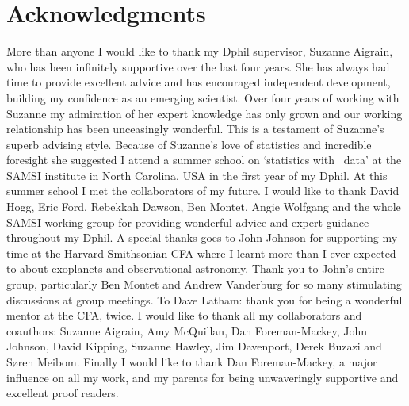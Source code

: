 % 

\cleardoublepage

\section*{Acknowledgments}

More than anyone I would like to thank my Dphil supervisor, Suzanne Aigrain,
who has been infinitely supportive over the last four years.
She has always had time to provide excellent advice and has encouraged
independent development, building my confidence as an emerging scientist.
Over four years of working with Suzanne my admiration of her expert knowledge
has only grown and our working relationship has been unceasingly wonderful.
This is a testament of Suzanne's superb advising style.
Because of Suzanne's love of statistics and incredible foresight she suggested
I attend a summer school on `statistics with \kepler\ data' at the SAMSI
institute in North Carolina, USA in the first year of my Dphil.
At this summer school I met the collaborators of my future.
I would like to thank David Hogg, Eric Ford, Rebekkah Dawson, Ben Montet,
Angie Wolfgang and the whole SAMSI working group for providing wonderful
advice and expert guidance throughout my Dphil.
A special thanks goes to John Johnson for supporting my time at the
Harvard-Smithsonian CFA where I learnt more than I ever expected to about
exoplanets and observational astronomy.
Thank you to John's entire group, particularly Ben Montet and Andrew
Vanderburg for so many stimulating discussions at group meetings.
To Dave Latham: thank you for being a wonderful mentor at the CFA, twice.
I would like to thank all my collaborators and coauthors: Suzanne Aigrain, Amy
McQuillan, Dan Foreman-Mackey, John Johnson, David Kipping, Suzanne Hawley,
Jim Davenport, Derek Buzazi and S{\o}ren Meibom.
Finally I would like to thank Dan Foreman-Mackey, a major influence on all my
work, and my parents for being unwaveringly supportive and excellent proof
readers.

